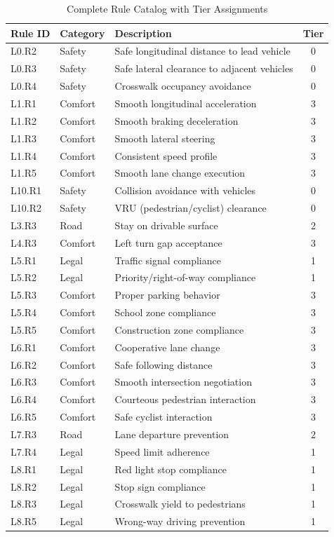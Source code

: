 \begin{table}[t]
\centering
\caption{Complete Rule Catalog with Tier Assignments}
\label{tab:rule_catalog}
\begin{tabular}{llp{4cm}c}
\toprule
\textbf{Rule ID} & \textbf{Category} & \textbf{Description} & \textbf{Tier} \\
\midrule
L0.R2 & Safety & Safe longitudinal distance to lead vehicle & 0 \\
L0.R3 & Safety & Safe lateral clearance to adjacent vehicles & 0 \\
L0.R4 & Safety & Crosswalk occupancy avoidance & 0 \\
L1.R1 & Comfort & Smooth longitudinal acceleration & 3 \\
L1.R2 & Comfort & Smooth braking deceleration & 3 \\
L1.R3 & Comfort & Smooth lateral steering & 3 \\
L1.R4 & Comfort & Consistent speed profile & 3 \\
L1.R5 & Comfort & Smooth lane change execution & 3 \\
L10.R1 & Safety & Collision avoidance with vehicles & 0 \\
L10.R2 & Safety & VRU (pedestrian/cyclist) clearance & 0 \\
L3.R3 & Road & Stay on drivable surface & 2 \\
L4.R3 & Comfort & Left turn gap acceptance & 3 \\
L5.R1 & Legal & Traffic signal compliance & 1 \\
L5.R2 & Legal & Priority/right-of-way compliance & 1 \\
L5.R3 & Comfort & Proper parking behavior & 3 \\
L5.R4 & Comfort & School zone compliance & 3 \\
L5.R5 & Comfort & Construction zone compliance & 3 \\
L6.R1 & Comfort & Cooperative lane change & 3 \\
L6.R2 & Comfort & Safe following distance & 3 \\
L6.R3 & Comfort & Smooth intersection negotiation & 3 \\
L6.R4 & Comfort & Courteous pedestrian interaction & 3 \\
L6.R5 & Comfort & Safe cyclist interaction & 3 \\
L7.R3 & Road & Lane departure prevention & 2 \\
L7.R4 & Legal & Speed limit adherence & 1 \\
L8.R1 & Legal & Red light stop compliance & 1 \\
L8.R2 & Legal & Stop sign compliance & 1 \\
L8.R3 & Legal & Crosswalk yield to pedestrians & 1 \\
L8.R5 & Legal & Wrong-way driving prevention & 1 \\
\bottomrule
\end{tabular}
\end{table}
